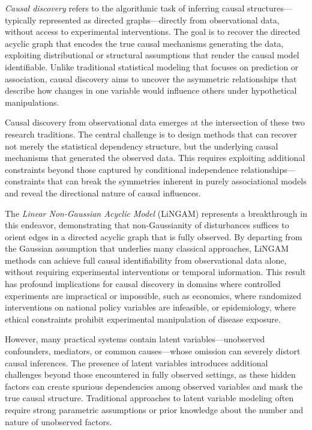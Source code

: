 \documentclass[11pt,a4paper]{article}
\numberwithin{equation}{section}
\begin{document}
\textit{Causal discovery} refers to the algorithmic task of inferring causal structures—typically represented as directed graphs—directly from observational data, without access to experimental interventions. The goal is to recover the directed acyclic graph that encodes the true causal mechanisms generating the data, exploiting distributional or structural assumptions that render the causal model identifiable. Unlike traditional statistical modeling that focuses on prediction or association, causal discovery aims to uncover the asymmetric relationships that describe how changes in one variable would influence others under hypothetical manipulations.

Causal discovery from observational data emerges at the intersection of these two research traditions. The central challenge is to design methods that can recover not merely the statistical dependency structure, but the underlying causal mechanisms that generated the observed data. This requires exploiting additional constraints beyond those captured by conditional independence relationships—constraints that can break the symmetries inherent in purely associational models and reveal the directional nature of causal influences.

The \emph{Linear Non-Gaussian Acyclic Model} (LiNGAM) \citep{shimizu:hoyer:2006} represents a breakthrough in this endeavor, demonstrating that non-Gaussianity of disturbances suffices to orient edges in a directed acyclic graph that is fully observed. By departing from the Gaussian assumption that underlies many classical approaches, LiNGAM methods can achieve full causal identifiability from observational data alone, without requiring experimental interventions or temporal information. This result has profound implications for causal discovery in domains where controlled experiments are impractical or impossible, such as economics, where randomized interventions on national policy variables are infeasible, or epidemiology, where ethical constraints prohibit experimental manipulation of disease exposure.

However, many practical systems contain latent variables—unobserved confounders, mediators, or common causes—whose omission can severely distort causal inferences. The presence of latent variables introduces additional challenges beyond those encountered in fully observed settings, as these hidden factors can create spurious dependencies among observed variables and mask the true causal structure. Traditional approaches to latent variable modeling often require strong parametric assumptions or prior knowledge about the number and nature of unobserved factors.
\end{document}
